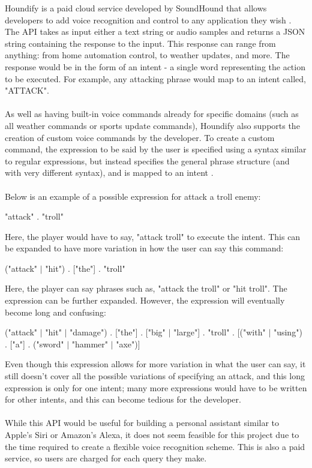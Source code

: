 \documentclass[12pt]{article}
\begin{document}
Houndify is a paid cloud service developed by SoundHound that allows developers to add voice recognition and control to any application they wish \cite{RefWorks:30}. The API takes as input either a text string or audio samples and returns a JSON string containing the response to the input. This response can range from anything: from home automation control, to weather updates, and more. The response would be in the form of an intent - a single word representing the action to be executed. For example, any attacking phrase would map to an intent called, "ATTACK".
\\
\\
As well as having built-in voice commands already for specific domains (such as all weather commands or sports update commands), Houndify also supports the creation of custom voice commands by the developer. To create a custom command, the expression to be said by the user is specified using a syntax similar to regular expressions, but instead specifies the general phrase structure (and with very different syntax), and is mapped to an intent \cite{RefWorks:33}.
\\
\\
Below is an example of a possible expression for attack a troll enemy:
\begin{center}
"attack" . "troll"
\end{center}
Here, the player would have to say, "attack troll" to execute the intent. This can be expanded to have more variation in how the user can say this command:
\begin{center}
("attack" $\vert$ "hit") . ["the"] . "troll"
\end{center}
Here, the player can say phrases such as, "attack the troll" or "hit troll". The expression can be further expanded. However, the expression will eventually become long and confusing:
\begin{center}
("attack" $\vert$ "hit" $\vert$ "damage") . ["the"] . ["big" $\vert$ "large"] . "troll" . [("with" $\vert$ "using") . ["a"] . ("sword" $\vert$ "hammer" $\vert$ "axe")]
\end{center}
Even though this expression allows for more variation in what the user can say, it still doesn't cover all the possible variations of specifying an attack, and this long expression is only for one intent; many more expressions would have to be written for other intents, and this can become tedious for the developer.
\\
\\
While this API would be useful for building a personal assistant similar to Apple's Siri or Amazon's Alexa, it does not seem feasible for this project due to the time required to create a flexible voice recognition scheme. This is also a paid service, so users are charged for each query they make.
\end{document}
